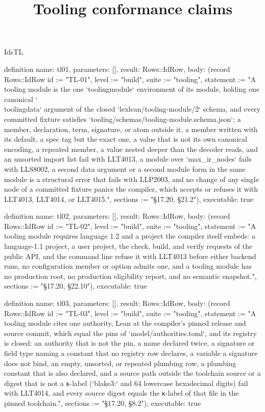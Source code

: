 \begin{lexlean}{IdsTL}
\title{Tooling conformance claims}
\begin{semanticmodule}
definition{
  name: tl01,
  parameters: [],
  result: Rows::IdRow,
  body: (record Rows::IdRow {id := "TL-01", level := "build", suite := "tooling", statement := "A tooling module is the one `toolingmodule` environment of its module, holding one canonical `\\toolingdata` argument of the closed `lexlean/tooling-module/2` schema, and every committed fixture satisfies `tooling/schemas/tooling-module.schema.json`; a member, declaration, term, signature, or atom outside it, a member written with its default, a spec tag but the exact one, a value that is not its own canonical encoding, a repeated member, a value nested deeper than the decoder reads, and an unsorted import list fail with LLT4013, a module over `max_ir_nodes` fails with LLS8002, a second data argument or a second module form in the same module is a structural error that fails with LLP2003, and no change of any single node of a committed fixture panics the compiler, which accepts or refuses it with LLT4013, LLT4014, or LLT4015.", sections := "§17.20, §21.2"}),
  executable: true
}

definition{
  name: tl02,
  parameters: [],
  result: Rows::IdRow,
  body: (record Rows::IdRow {id := "TL-02", level := "build", suite := "tooling", statement := "A tooling module requires language 1.2 and a project the compiler itself embeds: a language-1.1 project, a user project, the check, build, and verify requests of the public API, and the command line refuse it with LLT4013 before either backend runs, no configuration member or option admits one, and a tooling module has no production root, no production eligibility report, and no semantic snapshot.", sections := "§17.20, §22.10"}),
  executable: true
}

definition{
  name: tl03,
  parameters: [],
  result: Rows::IdRow,
  body: (record Rows::IdRow {id := "TL-03", level := "build", suite := "tooling", statement := "A tooling module cites one authority, Lean at the compiler's pinned release and source commit, which equal the pins of `model/authorities.toml`, and its registry is closed: an authority that is not the pin, a name declared twice, a signature or field type naming a constant that no registry row declares, a variable a signature does not bind, an empty, unsorted, or repeated plumbing row, a plumbing constant that is also declared, and a source path outside the toolchain source or a digest that is not a κ-label (`blake3:` and 64 lowercase hexadecimal digits) fail with LLT4014, and every source digest equals the κ-label of that file in the pinned toolchain.", sections := "§17.20, §8.2"}),
  executable: true
}


\end{semanticmodule}
\end{lexlean}
